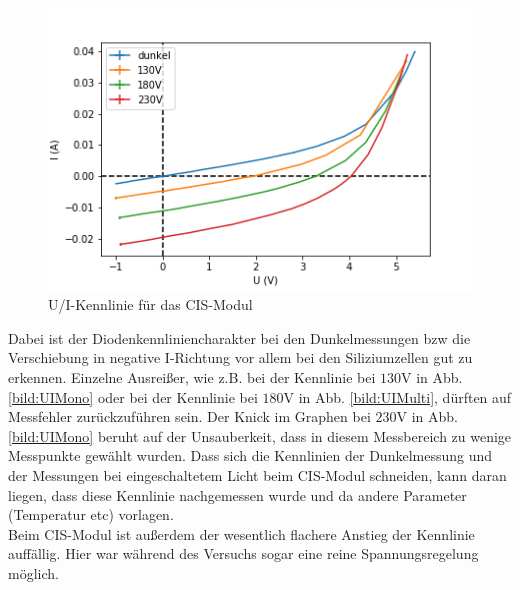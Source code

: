 \begin{figure}[h]
    \centering
    \includegraphics[scale=0.75]{Bilder/UICIS.png}
    \caption{U/I-Kennlinie für das CIS-Modul}
    \label{bild:UICIS}
\end{figure}

Dabei ist der Diodenkennliniencharakter bei den Dunkelmessungen bzw die Verschiebung in negative I-Richtung vor allem bei den 
Siliziumzellen gut zu erkennen. Einzelne Ausreißer, wie z.B. bei der Kennlinie bei $130$V in Abb. \ref{bild:UIMono} oder bei der 
Kennlinie bei $180$V in Abb. \ref{bild:UIMulti}, dürften auf Messfehler zurückzuführen sein. Der Knick im Graphen bei $230$V in Abb.
\ref{bild:UIMono} beruht auf der Unsauberkeit, dass in diesem Messbereich zu wenige Messpunkte gewählt wurden. Dass sich die Kennlinien 
der Dunkelmessung und der Messungen bei eingeschaltetem Licht beim CIS-Modul schneiden, kann daran liegen, dass diese Kennlinie 
nachgemessen wurde und da andere Parameter (Temperatur etc) vorlagen.\\
Beim CIS-Modul ist außerdem der wesentlich flachere Anstieg der Kennlinie auffällig. Hier war während des Versuchs sogar eine reine 
Spannungsregelung möglich. 


